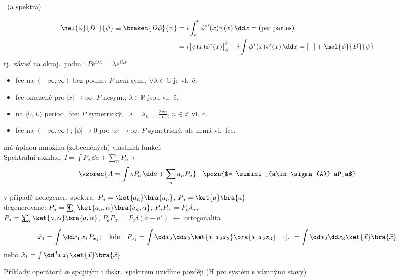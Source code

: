  \ (a spektra)

\begin{priklad}[Př: $P = -i\dv{x}$ \dots\ neomezený, symetrický (v záv.\ na prostoru)]
\begin{align*}
  \mel{\phi}{D^\dagger}{\psi} \equiv \braket{D\phi}{\psi} &= i\int_a^b\phi^{*\prime}(x)\psi(x)\,\dd x = \text{(per partes)} \\
  &= i\big[\psi(x)\phi^*(x)\big]_a^b - i\int\phi^*(x)\psi'(x)\,\dd x = [\ \ ] + \mel{\phi}{D}{\psi}
\end{align*}
tj.\ závisí na okraj.\ podm.: \hfill $Pe^{i\lambda x} = \lambda e^{i\lambda x}$
\begin{itemize}[nosep]
  \item[(a)] fce na $(-\infty,\infty)$ bez podm.: $P$ není sym., $\forall\lambda\in\mathbb{C}$ je vl.\ č.
  \item[(b)] fce omezené pro $|x|\to\infty$: $P$ nesym.; $\lambda\in\mathbb{R}$ jsou vl.\ č.
  \item[(c)] na $\langle 0,L\rangle$ period.\ fce: $P$ symetrický, \ $\lambda = \lambda_n = \frac{2\pi n}{L}$, $n\in\mathbb{Z}$ vl.\ č.
  \item[(d)] fce na $(-\infty,\infty)$; $|\phi|\to 0$ pro $|x|\to\infty$: $P$ symetrický, ale nemá vl.\ fce.
\end{itemize}
\end{priklad}

\begin{veta}
má úplnou množinu (zobecněných) vlastních funkcí: \\
Spektrální rozklad: \quad $I = \int P_a\,\dd a + \sum_n P_n$ \quad $\leftarrow$ 
\[
  \vzorec{A = \int aP_a\,\dd a + \sum_n a_nP_n} \quad \pozn{$= \sumint_{a\in\sigma(A)} aP_a$}
\]
\end{veta}
v případě nedegener.\ spektra: \quad $P_n = \ket{a_n}\bra{a_n}$, \quad $P_a = \ket{a}\bra{a}$ \\
\phantom{v případě} degenerované: \quad $P_n = \sumint_\alpha\ket{a_n,\alpha}\bra{a_n,\alpha}$, \quad $P_nP_{n'} = P_n\delta_{nn'}$ \\
\phantom{v případě degenerované:} \quad $P_a = \sumint_\alpha\ket{a,\alpha}\bra{a,\alpha}$, \quad $P_aP_{a'} = P_a\delta(a - a')$ \quad $\leftarrow$ \underline{ortogonalita}

\begin{priklad}[PŘ: v $\mathcal{H} = L^2(\mathbb{R}^3)$ operátor $Q_1\equiv\hat x_1$]
\[
  \hat x_1 = \int\dd x_1\,x_1P_{x_1};\quad\text{kde}\quad P_{x_1} = \int\dd x_2\dd x_3\ket{x_1x_2x_3}\bra{x_1x_2x_3}
  \quad\text{tj.}\ = \int\dd x_2\dd x_3\ket{\vec x}\bra{\vec x}
\]
nebo \quad $\hat x_1 = \int\dd^3x\,x_1\ket{\vec x}\bra{\vec x}$
\end{priklad}
Příklady operátorů se spojitým i diskr.\ spektrem uvidíme později (H pro systém s vázanými stavy)

